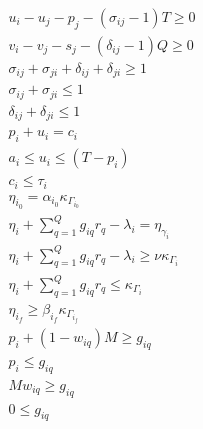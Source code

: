\documentclass[letterpaper, 10pt, conference]{IEEEtran}
\begin{document}
\begin{subequations}
\label{eq:dynconstrs}
\begin{align}
    u_i - u_j - p_j - (\sigma_{ij} - 1)T \geq 0                             \label{subeq:m_time}         \\
    v_i - v_j - s_j - (\delta_{ij} - 1)Q \geq 0                             \label{subeq:m_space}        \\
    \sigma_{ij} + \sigma_{ji} + \delta_{ij} + \delta_{ji} \geq 1            \label{subeq:m_valid_pos}    \\
    \sigma_{ij} + \sigma_{ji} \leq 1                                        \label{subeq:m_sigma}        \\
    \delta_{ij} + \delta_{ji} \leq 1                                        \label{subeq:m_delta}        \\
    p_i + u_i = c_i                                                         \label{subeq:m_detach}       \\
    a_i \leq u_i \leq (T - p_i)                                             \label{subeq:m_valid_starts} \\
    c_i \leq \tau_i                                                         \label{subeq:m_valid_depart} \\
    \eta_{i_0} = \alpha_{i_0} \kappa_{\Gamma_{i_0}}                         \label{subeq:init_charge}    \\
    \eta_i + \sum_{q=1}^Q g_{iq} r_q - \lambda_i = \eta_{\gamma_i}          \label{subeq:next_charge}    \\
    \eta_i + \sum_{q=1}^Q g_{iq} r_q - \lambda_i \geq \nu \kappa_{\Gamma_i} \label{subeq:min_charge}     \\
    \eta_i + \sum_{q=1}^Q g_{iq} r_q \leq \kappa_{\Gamma_i}                 \label{subeq:max_charge}     \\
    \eta_{i_f} \geq \beta_{i_f} \kappa_{\Gamma_{i_f}}                       \label{subeq:final_charge}   \\
    p_i + (1 - w_{iq})M \geq g_{iq}                                         \label{subeq:gpgret}         \\
    p_i \leq g_{iq}                                                         \label{subeq:gples}          \\
    Mw_{iq} \geq g_{iq}                                                     \label{subeq:gwgret}         \\
    0 \leq g_{iq}                                                           \label{subeq:gwles}          \\

\end{align}
\end{subequations}
\end{document}
